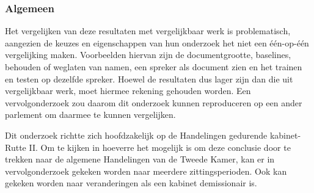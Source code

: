 \subsubsection{Algemeen}
Het vergelijken van deze resultaten met vergelijkbaar werk is problematisch, aangezien de keuzes en eigenschappen van hun onderzoek het niet een één-op-één vergelijking maken. Voorbeelden hiervan zijn de documentgrootte, baselines, behouden of weglaten van namen, een spreker als document zien en het trainen en testen op dezelfde spreker. Hoewel de resultaten dus lager zijn dan die uit vergelijkbaar werk, moet hiermee rekening gehouden worden. Een vervolgonderzoek zou daarom dit onderzoek kunnen reproduceren op een ander parlement om daarmee te kunnen vergelijken.\par
Dit onderzoek richtte zich hoofdzakelijk op de Handelingen gedurende kabinet-Rutte II. Om te kijken in hoeverre het mogelijk is om deze conclusie door te trekken naar de algemene Handelingen van de Tweede Kamer, kan er in vervolgonderzoek gekeken worden naar meerdere zittingsperioden. Ook kan gekeken worden naar veranderingen als een kabinet demissionair is.\par